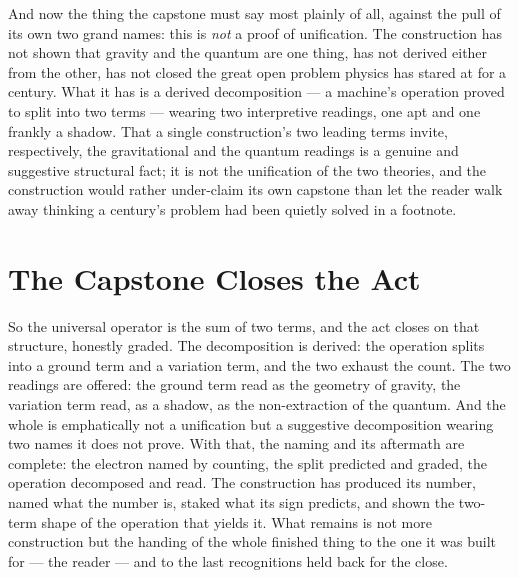And now the thing the capstone must say most plainly of all, against the pull of its own two grand names: this is
\emph{not} a proof of unification. The construction has not shown that gravity and the quantum are one thing, has not
derived either from the other, has not closed the great open problem physics has stared at for a century. What it
has is a derived decomposition --- a machine's operation proved to split into two terms --- wearing two
interpretive readings, one apt and one frankly a shadow. That a single construction's two leading terms invite,
respectively, the gravitational and the quantum readings is a genuine and suggestive structural fact; it is not
the unification of the two theories, and the construction would rather under-claim its own capstone than let the reader
walk away thinking a century's problem had been quietly solved in a footnote.

\section{The Capstone Closes the Act}

So the universal operator is the sum of two terms, and the act closes on that structure, honestly graded. The
decomposition is derived: the operation splits into a ground term and a variation term, and the two exhaust the
count. The two readings are offered: the ground term read as the geometry of gravity, the variation term read, as
a shadow, as the non-extraction of the quantum. And the whole is emphatically not a unification but a suggestive
decomposition wearing two names it does not prove. With that, the naming and its aftermath are complete: the
electron named by counting, the split predicted and graded, the operation decomposed and read. The construction
has produced its number, named what the number is, staked what its sign predicts, and shown the two-term shape of
the operation that yields it. What remains is not more construction but the handing of the whole finished thing to
the one it was built for --- the reader --- and to the last recognitions held back for the close.
